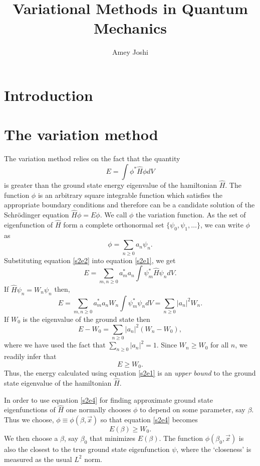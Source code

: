 \documentclass{article}
\numberwithin{equation}{section}
\begin{document}
\title{Variational Methods in Quantum Mechanics}
\author{Amey Joshi}
\maketitle
\section{Introduction}\label{s1}
\section{The variation method}\label{s2}
The variation method relies on the fact that the quantity
\begin{equation}\label{s2e1}
E = \int\phi^\ast\hat{H}\phi dV
\end{equation}
is greater than the ground state energy eigenvalue of the hamiltonian $\hat{H}$. 
The function $\phi$ is an arbitrary square integrable function which satisfies
the appropriate boundary conditions and therefore can be a candidate solution
of the Schr\"{o}dinger equation $\hat{H}\phi = E\phi$. We call $\phi$ the
variation function. As the set of eigenfunction of $\hat{H}$ form a complete
orthonormal set $\{\psi_0, \psi_1, \ldots\}$, we can write $\phi$ as
\begin{equation}\label{s2e2}
\phi = \sum_{n \ge 0}a_n\psi_n.
\end{equation}
Substituting equation \eqref{s2e2} into equation \eqref{s2e1}, we get
\[
E = \sum_{m,n \ge 0}a_m^\ast a_n \int \psi_m^\ast \hat{H}\psi_n dV.
\]
If $\hat{H}\psi_n = W_n\psi_n$ then,
\[
E = \sum_{m,n \ge 0}a_m^\ast a_n W_n \int\psi_m^\ast\psi_n dV = \sum_{n \ge 0}|a_n|^2W_n.
\]
If $W_0$ is the eigenvalue of the ground state then
\begin{equation}\label{s2e3}
E - W_0 = \sum_{n \ge 0}|a_n|^2(W_n - W_0),
\end{equation}
where we have used the fact that $\sum_{n \ge 0}|a_n|^2 = 1$. Since $W_n \ge W_0$
for all $n$, we readily infer that
\begin{equation}\label{s2e4}
E \ge W_0.
\end{equation}
Thus, the energy calculated using equation \eqref{s2e1} is an \emph{upper bound}
to the ground state eigenvalue of the hamiltonian $\hat{H}$. 

In order to use equation \eqref{s2e4} for finding approximate ground state
eigenfunctions of $\hat{H}$ one normally chooses $\phi$ to depend on some 
parameter, say $\beta$. Thus we choose, $\phi \equiv \phi(\beta, \vec{x})$
so that equation \eqref{s2e4} becomes
\begin{equation}\label{s2e5}
E(\beta) \ge W_0.
\end{equation}
We then choose a $\beta$, say $\beta_0$ that minimizes $E(\beta)$. The function
$\phi(\beta_0, \vec{x})$ is also the closest to the true ground state 
eigenfunction $\psi$, where the `closeness' is measured as the usual $L^2$ norm.
\end{document}
